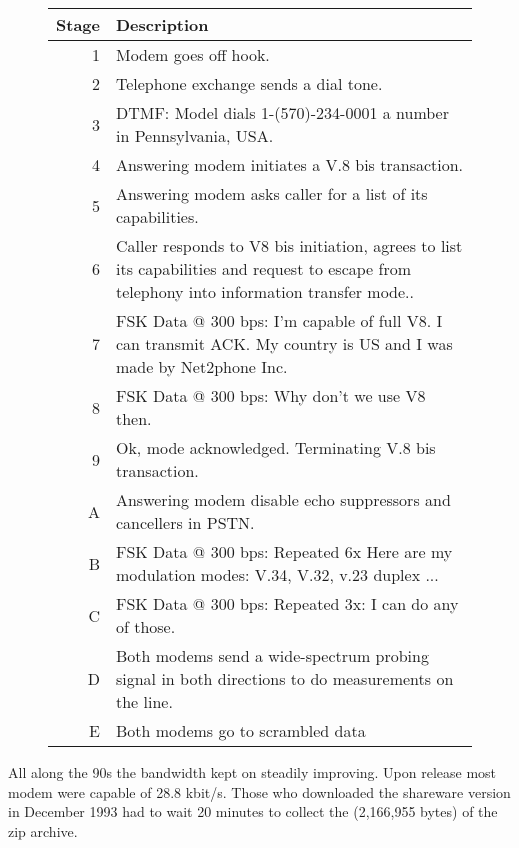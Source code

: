  \begin{figure}[H]
\centering  
\begin{tabularx}{\textwidth}{ R{0.1} L{1.9} }
  \toprule
  \textbf{Stage} &  \textbf{Description} \\
  \toprule 
   
   1 & Modem goes off hook.\\
   2 & Telephone exchange sends a dial tone.\\
   3 & DTMF: Model dials 1-(570)-234-0001 a number in Pennsylvania, USA.\\
   4 & Answering modem initiates a V.8 bis transaction.\\
   5 & Answering modem asks caller for a list of its capabilities.\\
   6 & Caller responds to V8 bis initiation, agrees to list its capabilities and request to escape from telephony into information transfer mode..\\
   7 & FSK Data @ 300 bps: I'm capable of full V8. I can transmit ACK. My country is US and I was made by Net2phone Inc.\\
   8 & FSK Data @ 300 bps: Why don't we use V8 then.\\
   9 & Ok, mode acknowledged. Terminating V.8 bis transaction.\\
   \toprule 
   A & Answering modem disable echo suppressors and cancellers in PSTN.\\
   B & FSK Data @ 300 bps: Repeated 6x Here are my modulation modes: V.34, V.32, v.23 duplex ...\\
   C & FSK Data @ 300 bps: Repeated 3x: I can do any of those. \\
   D & Both modems send a wide-spectrum probing signal in both directions to do measurements on the line.\\
   E & Both modems go to scrambled data \\
   \toprule
\end{tabularx}
\caption{}
\end{figure}
\par




All along the 90s the bandwidth kept on steadily improving. Upon \doom{}release most modem were capable of 28.8 kbit/s. Those who downloaded the shareware version in December 1993 had to wait 20 minutes to collect the (2,166,955 bytes) of the zip archive.\\
\par

